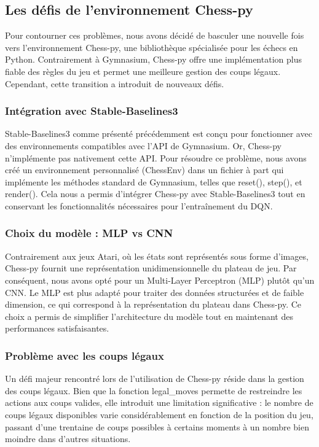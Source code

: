 \documentclass{article}
\begin{document}
\subsection{Les défis de l'environnement Chess-py}
\quad Pour contourner ces problèmes, nous avons décidé de basculer une nouvelle fois vers l'environnement Chess-py, une bibliothèque spécialisée pour les échecs en Python. Contrairement à Gymnasium, Chess-py offre une implémentation plus fiable des règles du jeu et permet une meilleure gestion des coups légaux. Cependant, cette transition a introduit de nouveaux défis.

    \subsubsection{Intégration avec Stable-Baselines3}

    \quad Stable-Baselines3 comme présenté précédemment est conçu pour fonctionner avec des environnements compatibles avec l'API de Gymnasium. Or, Chess-py n'implémente pas nativement cette API. Pour résoudre ce problème, nous avons créé un environnement personnalisé (ChessEnv) dans un fichier à part qui implémente les méthodes standard de Gymnasium, telles que reset(), step(), et render(). Cela nous a permis d'intégrer Chess-py avec Stable-Baselines3 tout en conservant les fonctionnalités nécessaires pour l'entraînement du DQN.

    \subsubsection{Choix du modèle : MLP vs CNN}

    \quad Contrairement aux jeux Atari, où les états sont représentés sous forme d'images, Chess-py fournit une représentation unidimensionnelle du plateau de jeu. Par conséquent, nous avons opté pour un Multi-Layer Perceptron (MLP) plutôt qu'un CNN. Le MLP est plus adapté pour traiter des données structurées et de faible dimension, ce qui correspond à la représentation du plateau dans Chess-py. Ce choix a permis de simplifier l'architecture du modèle tout en maintenant des performances satisfaisantes.

    \subsubsection{Problème avec les coups légaux}

    \quad Un défi majeur rencontré lors de l'utilisation de Chess-py réside dans la gestion des coups légaux. Bien que la fonction legal\_moves permette de restreindre les actions aux coups valides, elle introduit une limitation significative : le nombre de coups légaux disponibles varie considérablement en fonction de la position du jeu, passant d'une trentaine de coups possibles à certains moments à un nombre bien moindre dans d'autres situations.\\
\end{document}
